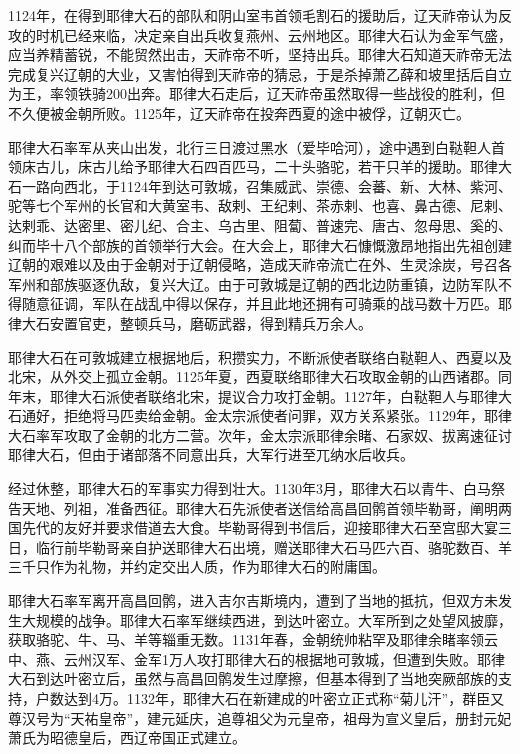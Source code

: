 1124年，在得到耶律大石的部队和阴山室韦首领毛割石的援助后，辽天祚帝认为反攻的时机已经来临，决定亲自出兵收复燕州、云州地区。耶律大石认为金军气盛，应当养精蓄锐，不能贸然出击，天祚帝不听，坚持出兵。耶律大石知道天祚帝无法完成复兴辽朝的大业，又害怕得到天祚帝的猜忌，于是杀掉萧乙薛和坡里括后自立为王，率领铁骑200出奔。耶律大石走后，辽天祚帝虽然取得一些战役的胜利，但不久便被金朝所败。1125年，辽天祚帝在投奔西夏的途中被俘，辽朝灭亡。

耶律大石率军从夹山出发，北行三日渡过黑水（爱毕哈河），途中遇到白鞑靼人首领床古儿，床古儿给予耶律大石四百匹马，二十头骆驼，若干只羊的援助。耶律大石一路向西北，于1124年到达可敦城，召集威武、崇德、会蕃、新、大林、紫河、驼等七个军州的长官和大黄室韦、敌剌、王纪剌、茶赤剌、也喜、鼻古德、尼剌、达剌乖、达密里、密儿纪、合主、乌古里、阻蔔、普速完、唐古、忽母思、奚的、纠而毕十八个部族的首领举行大会。在大会上，耶律大石慷慨激昂地指出先祖创建辽朝的艰难以及由于金朝对于辽朝侵略，造成天祚帝流亡在外、生灵涂炭，号召各军州和部族驱逐仇敌，复兴大辽。由于可敦城是辽朝的西北边防重镇，边防军队不得随意征调，军队在战乱中得以保存，并且此地还拥有可骑乘的战马数十万匹。耶律大石安置官吏，整顿兵马，磨砺武器，得到精兵万余人。

耶律大石在可敦城建立根据地后，积攒实力，不断派使者联络白鞑靼人、西夏以及北宋，从外交上孤立金朝。1125年夏，西夏联络耶律大石攻取金朝的山西诸郡。同年末，耶律大石派使者联络北宋，提议合力攻打金朝。1127年，白鞑靼人与耶律大石通好，拒绝将马匹卖给金朝。金太宗派使者问罪，双方关系紧张。1129年，耶律大石率军攻取了金朝的北方二营。次年，金太宗派耶律余睹、石家奴、拔离速征讨耶律大石，但由于诸部落不同意出兵，大军行进至兀纳水后收兵。

经过休整，耶律大石的军事实力得到壮大。1130年3月，耶律大石以青牛、白马祭告天地、列祖，准备西征。耶律大石先派使者送信给高昌回鹘首领毕勒哥，阐明两国先代的友好并要求借道去大食。毕勒哥得到书信后，迎接耶律大石至宫邸大宴三日，临行前毕勒哥亲自护送耶律大石出境，赠送耶律大石马匹六百、骆驼数百、羊三千只作为礼物，并约定交出人质，作为耶律大石的附庸国。

耶律大石率军离开高昌回鹘，进入吉尔吉斯境内，遭到了当地的抵抗，但双方未发生大规模的战争。耶律大石率军继续西进，到达叶密立。大军所到之处望风披靡，获取骆驼、牛、马、羊等辎重无数。1131年春，金朝统帅粘罕及耶律余睹率领云中、燕、云州汉军、金军1万人攻打耶律大石的根据地可敦城，但遭到失败。耶律大石到达叶密立后，虽然与高昌回鹘发生过摩擦，但基本得到了当地突厥部族的支持，户数达到4万。1132年，耶律大石在新建成的叶密立正式称“菊儿汗”，群臣又尊汉号为“天祐皇帝”，建元延庆，追尊祖父为元皇帝，祖母为宣义皇后，册封元妃萧氏为昭德皇后，西辽帝国正式建立。

